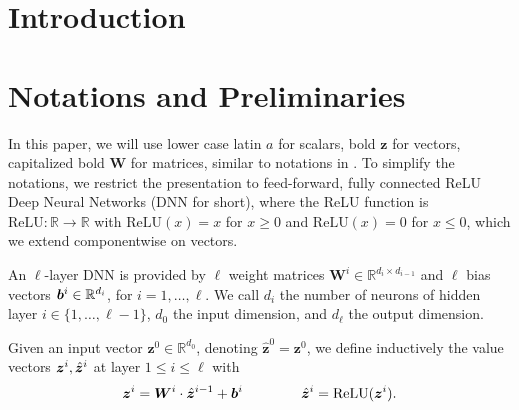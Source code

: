 \documentclass{llncs}
\newcommand{\ReLU}{\mathrm{ReLU}}
\begin{document}
\begin{abstract}
		
	\end{abstract}
	

\section{Introduction}







%


\section{Notations and Preliminaries}

In this paper, we will use lower case latin $a$ for scalars, bold $\boldsymbol{z}$ for vectors, 
capitalized bold $\boldsymbol{W}$ for matrices, similar to notations in \cite{crown}.
To simplify the notations, we restrict the presentation to feed-forward, 
fully connected ReLU Deep Neural Networks (DNN for short), where the ReLU function is $\ReLU : \mathbb{R} \rightarrow \mathbb{R}$ with
$\ReLU(x)=x$ for $x \geq 0$ and $\ReLU(x)=0$ for $x \leq 0$, which we extend componentwise on vectors.




An $\ell$-layer DNN is provided by $\ell$ weight matrices 
$\boldsymbol{W}^i \in \mathbb{R}^{d_i\times d_{i-1}}$
and $\ell$ bias vectors ${\bm{b}}^i \in \mathbb{R}^{d_i}$, for $i=1, \ldots, \ell$.
We call $d_i$ the number of neurons of hidden layer $i \in \{1, \ldots, \ell-1\}$,
$d_0$ the input dimension, and $d_\ell$ the output dimension.

Given an input vector $\boldsymbol{z}^0 \in \mathbb{R}^{d_0}$, 
denoting $\hat{\boldsymbol{z}}^{0}={\boldsymbol{z}}^0$, we define inductively the value vectors $\boldsymbol{z}^i,\hat{{\bm{z}}}^i$ at layer $1 \leq i \leq \ell$ with
\begin{align*}
	\boldsymbol{z}^{i} = \boldsymbol{W}^i\cdot \hat{\boldsymbol{z}}^{i-1}+ \vb^i \qquad \, \qquad
	\hat{\boldsymbol{z}}^{i} = \ReLU({\boldsymbol{z}}^i).
\end{align*} 
\end{document}
